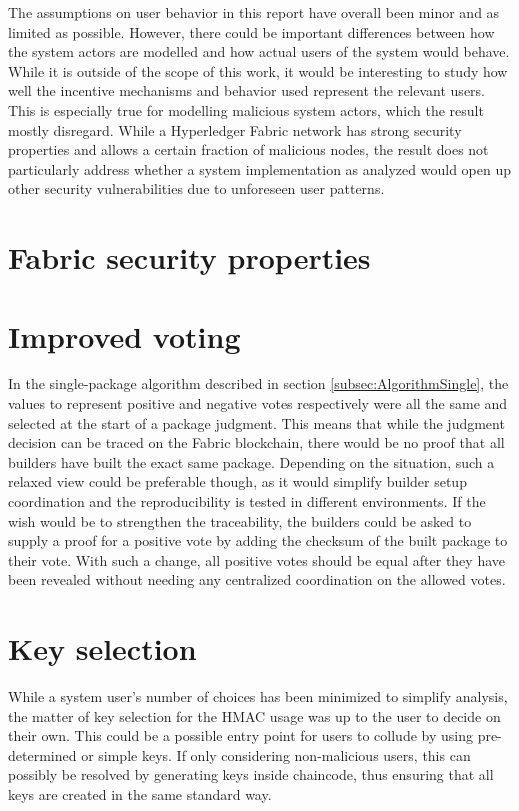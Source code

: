 The assumptions on user behavior in this report have overall been minor and as limited as possible. However, there could be important differences between how the system actors are modelled and how actual users of the system would behave. While it is outside of the scope of this work, it would be interesting to study how well the incentive mechanisms and behavior used represent the relevant users. This is especially true for modelling malicious system actors, which the result mostly disregard. While a Hyperledger Fabric network has strong security properties and allows a certain fraction of malicious nodes, the result does not particularly address whether a system implementation as analyzed would open up other security vulnerabilities due to unforeseen user patterns.

\section{Fabric security properties}

\section{Improved voting}

In the single-package algorithm described in section \ref{subsec:AlgorithmSingle}, the values to represent positive and negative votes respectively were all the same and selected at the start of a package judgment. This means that while the judgment decision can be traced on the Fabric blockchain, there would be no proof that all builders have built the exact same package. Depending on the situation, such a relaxed view could be preferable though, as it would simplify builder setup coordination and the reproducibility is tested in different environments. If the wish would be to strengthen the traceability, the builders could be asked to supply a proof for a positive vote by adding the checksum of the built package to their vote. With such a change, all positive votes should be equal after they have been revealed without needing any centralized coordination on the allowed votes.

\section{Key selection}

While a system user's number of choices has been minimized to simplify analysis, the matter of key selection for the \gls{HMAC} usage was up to the user to decide on their own. This could be a possible entry point for users to collude by using pre-determined or simple keys. If only considering non-malicious users, this can possibly be resolved by generating keys inside chaincode, thus ensuring that all keys are created in the same standard way. 


